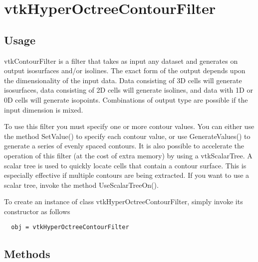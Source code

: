 \section{vtkHyperOctreeContourFilter}

\subsection{Usage}

 vtkContourFilter is a filter that takes as input any dataset and 
 generates on output isosurfaces and/or isolines. The exact form 
 of the output depends upon the dimensionality of the input data. 
 Data consisting of 3D cells will generate isosurfaces, data 
 consisting of 2D cells will generate isolines, and data with 1D 
 or 0D cells will generate isopoints. Combinations of output type 
 are possible if the input dimension is mixed.

 To use this filter you must specify one or more contour values.
 You can either use the method SetValue() to specify each contour
 value, or use GenerateValues() to generate a series of evenly
 spaced contours. It is also possible to accelerate the operation of
 this filter (at the cost of extra memory) by using a
 vtkScalarTree. A scalar tree is used to quickly locate cells that
 contain a contour surface. This is especially effective if multiple
 contours are being extracted. If you want to use a scalar tree,
 invoke the method UseScalarTreeOn().

To create an instance of class vtkHyperOctreeContourFilter, simply
invoke its constructor as follows
\begin{verbatim}
  obj = vtkHyperOctreeContourFilter
\end{verbatim}
\subsection{Methods}


